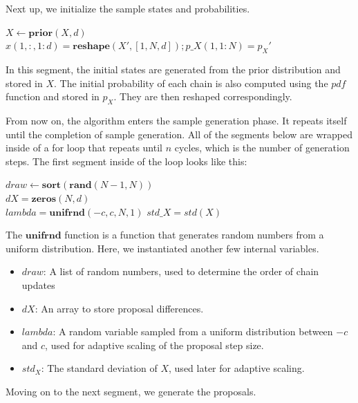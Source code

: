 Next up, we initialize the sample states and probabilities.\\
\begin{algorithm}[H]
$X \gets \textbf{prior}(X, d)$\\
$x(1, :, 1:d) = \textbf{reshape}(X', [1, N, d]); p\_X(1, 1:N) = p_X'$
\end{algorithm}

In this segment, the initial states are generated from the prior distribution and stored in $X$. The initial probability of each chain is also computed using the $pdf$ function and stored in $p_X$. They are then reshaped correspondingly.

From now on, the algorithm enters the sample generation phase. It repeats itself until the completion of sample generation. All of the segments below are wrapped inside of a for loop that repeats until $n$ cycles, which is the number of generation steps. The first segment inside of the loop looks like this:

\begin{algorithm}[H]
$ draw \gets \textbf{sort}(\textbf{rand}(N-1, N))$\\
$dX = \textbf{zeros}(N, d)$\\
$lambda = \textbf{unifrnd}(-c, c, N, 1)$
$std\_X = std(X)$
\end{algorithm}

The $\textbf{unifrnd}$ function is a function that generates random numbers from a uniform distribution. Here, we instantiated another few internal variables.
\begin{itemize}
    \item $draw$: A list of random numbers, used to determine the order of chain updates
    \item $dX$: An array to store proposal differences.
    \item $lambda$: A random variable sampled from a uniform distribution between \(-c\) and \(c\), used for adaptive scaling of the proposal step size.
    \item $std_X$: The standard deviation of $X$, used later for adaptive scaling.
\end{itemize}

Moving on to the next segment, we generate the proposals.

\begin{algorithm}[H]
\end{algorithm}


